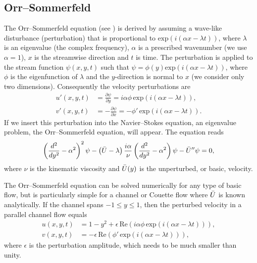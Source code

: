 \subsection{Orr--Sommerfeld}
\label{sec:mortensen:OS}

The Orr--Sommerfeld equation (see \citet{Orzag1971}) is derived by
assuming a wave-like disturbance (perturbation) that is proportional to
$\mathrm{exp}(i(\alpha x-\lambda t))$, where $\lambda$ is an eigenvalue
(the complex frequency), $\alpha$
is a prescribed wavenumber (we use $\alpha=1$), $x$ is the streamwise
direction and $t$ is time. The perturbation is applied to the stream
function $\psi(x,y,t)$ such that $\psi=\phi(y) \mathrm{exp}(i(\alpha
x- \lambda t))$, where $\phi$ is the eigenfunction of $\lambda$
and the $y$-direction is normal to $x$ (we consider only two
dimensions). Consequently the velocity perturbations are
\begin{align}
 u'(x,y,t)&=\frac{\partial \psi}{\partial y}=i\alpha \phi \, \mathrm{exp}(i(\alpha x- \lambda t)),
\\
 v'(x,y,t)&=-\frac{\partial \psi}{\partial x}=-\phi' \, \mathrm{exp}(i(\alpha x- \lambda t)).
\end{align}
If we insert this perturbation into the Navier--Stokes equation, an
eigenvalue problem, the Orr--Sommerfeld equation, will appear. The
equation reads
\begin{equation}
 \left( \frac{d^2}{dy^2}-\alpha^2\right)^2\psi
      - \left(\Bar{U}-\lambda \right) \frac{i \alpha}{\nu}
          \left( \frac{d^2}{dy^2}-\alpha^2\right)\psi - \Bar{U}''\psi=0,
 \label{eq:mortensen:OrrS}
\end{equation}
where $\nu$ is the kinematic viscosity and $\Bar{U}(y)$ is the
unperturbed, or basic, velocity.

The Orr--Sommerfeld equation can be solved numerically for any type of
basic flow, but is particularly simple for a channel or Couette flow
where $\Bar{U}$ is known analytically. If the channel spans
$-1\leqslant y \leqslant 1$, then the perturbed velocity in a parallel
channel flow equals
\begin{equation}
\begin{split}
 u(x,y,t)&=1-y^2+\epsilon \,\text{Re}\left(i\alpha \phi \, \mathrm{exp}(i(\alpha x-\lambda t))\right),
\\
 v(x,y,t)&=-\epsilon \, \text{Re}\left(\phi' \, \mathrm{exp}(i(\alpha x-\lambda t))\right),
\end{split}
\label{eq:mortensen:channel}
\end{equation}
where $\epsilon$ is the perturbation amplitude, which needs to be much
smaller than unity.

